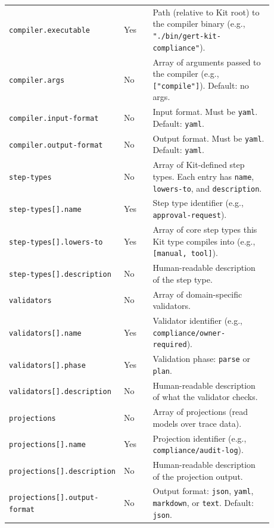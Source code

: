 \begin{longtable}{p{0.25\linewidth}p{0.12\linewidth}p{0.51\linewidth}}
\texttt{compiler.executable} & Yes & Path (relative to Kit root) to the compiler binary (e.g., \texttt{"./bin/gert-kit-compliance"}). \\

\texttt{compiler.args} & No & Array of arguments passed to the compiler (e.g., \texttt{["compile"]}). Default: no args. \\

\texttt{compiler.input-format} & No & Input format. Must be \texttt{yaml}. Default: \texttt{yaml}. \\

\texttt{compiler.output-format} & No & Output format. Must be \texttt{yaml}. Default: \texttt{yaml}. \\

\texttt{step-types} & No & Array of Kit-defined step types. Each entry has \texttt{name}, \texttt{lowers-to}, and \texttt{description}. \\

\texttt{step-types[].name} & Yes & Step type identifier (e.g., \texttt{approval-request}). \\

\texttt{step-types[].lowers-to} & Yes & Array of core step types this Kit type compiles into (e.g., \texttt{[manual, tool]}). \\

\texttt{step-types[].description} & No & Human-readable description of the step type. \\

\texttt{validators} & No & Array of domain-specific validators. \\

\texttt{validators[].name} & Yes & Validator identifier (e.g., \texttt{compliance/owner-required}). \\

\texttt{validators[].phase} & Yes & Validation phase: \texttt{parse} or \texttt{plan}. \\

\texttt{validators[].description} & No & Human-readable description of what the validator checks. \\

\texttt{projections} & No & Array of projections (read models over trace data). \\

\texttt{projections[].name} & Yes & Projection identifier (e.g., \texttt{compliance/audit-log}). \\

\texttt{projections[].description} & No & Human-readable description of the projection output. \\

\texttt{projections[].output-format} & No & Output format: \texttt{json}, \texttt{yaml}, \texttt{markdown}, or \texttt{text}. Default: \texttt{json}. \\

\end{longtable}

